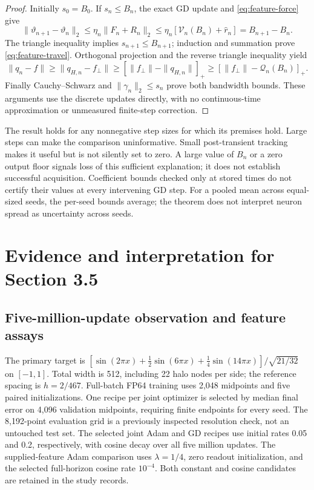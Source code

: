 \begin{proof}
Initially $s_0=B_0$. If $s_n\le B_n$, the exact GD update and
\eqref{eq:feature-force} give
\[
 \|\vartheta_{n+1}-\vartheta_n\|_2
 \le\eta_n\|F_n+R_n\|_2
 \le\eta_n[\mathcal V_n(B_n)+\widehat r_n]=B_{n+1}-B_n.
\]
The triangle inequality implies $s_{n+1}\le B_{n+1}$; induction and summation
prove \eqref{eq:feature-travel}. Orthogonal projection and the reverse
triangle inequality yield
\[
 \|q_n-f\|\ge\|q_{H,n}-f_\perp\|
 \ge[\|f_\perp\|-\|q_{H,n}\|]_+
 \ge[\|f_\perp\|-\mathcal Q_n(B_n)]_+.
\]
Finally Cauchy--Schwarz and $\|\gamma_n\|_2\le s_n$ prove both bandwidth
bounds. These arguments use the discrete updates directly, with no
continuous-time approximation or unmeasured finite-step correction.
\end{proof}

The result holds for any nonnegative step sizes for which its premises
hold. Large steps can make the comparison uninformative. Small post-transient
tracking makes it useful but is not silently set to zero. A large value
of $B_n$ or a zero output floor signals loss of this sufficient explanation;
it does not establish successful acquisition. Coefficient bounds checked only
at stored times do not certify their values at every intervening GD step.
For a pooled mean across equal-sized seeds, the per-seed bounds average;
the theorem does not interpret neuron spread as uncertainty across seeds.

\section{Evidence and interpretation for Section 3.5}
\label{app:feature-evidence}

\subsection{Five-million-update observation and feature assays}
The primary target is
$[\sin(2\pi x)+\frac12\sin(6\pi x)+\frac14\sin(14\pi x)]/\sqrt{21/32}$
on $[-1,1]$. Total width is 512, including 22 halo nodes per side;
the reference spacing is $h=2/467$. Full-batch FP64 training uses 2,048
midpoints and five paired initializations. One recipe per joint optimizer
is selected by median final error on 4,096 validation midpoints, requiring
finite endpoints for every seed. The 8,192-point evaluation grid is a
previously inspected resolution check, not an untouched test set.
The selected joint Adam and GD recipes use initial rates 0.05 and 0.2,
respectively, with cosine decay over all five million updates.
The supplied-feature Adam comparison uses $\lambda=1/4$, zero readout
initialization, and the selected full-horizon cosine rate $10^{-4}$.
Both constant and cosine candidates are retained in the study records.

